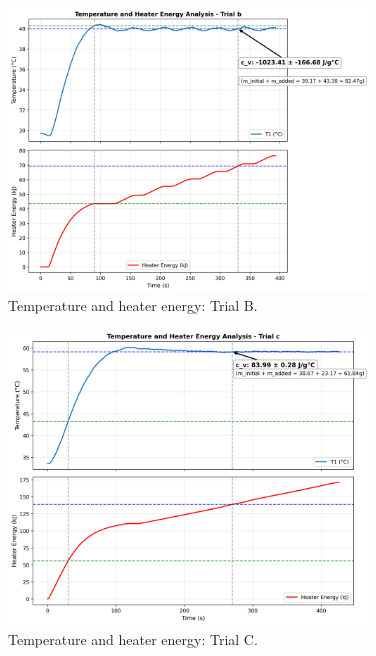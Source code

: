 \documentclass[12pt]{article}
\begin{document}
\begin{figure}[H]
\centering
\includegraphics[width=0.85\textwidth]{graphs/part2_trial_b_temp_heater_energy.png}
\caption{Temperature and heater energy: Trial B.}
\end{figure}

\begin{figure}[H]
\centering
\includegraphics[width=0.85\textwidth]{graphs/part2_trial_c_temp_heater_energy.png}
\caption{Temperature and heater energy: Trial C.}
\end{figure}
\end{document}
